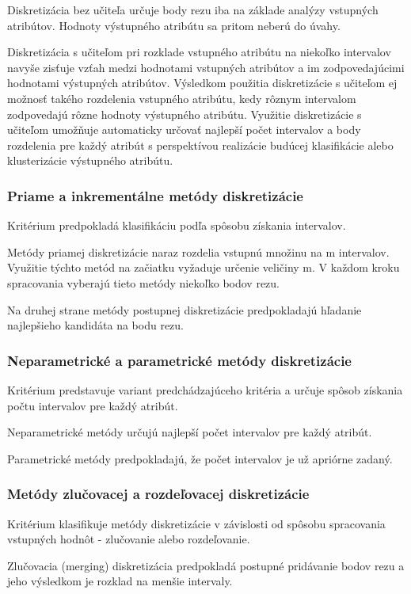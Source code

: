 Diskretizácia bez učiteľa určuje body rezu iba na základe analýzy vstupných atribútov. Hodnoty výstupného atribútu sa pritom neberú do úvahy. 

Diskretizácia s učiteľom pri rozklade vstupného atribútu na niekoľko intervalov navyše zisťuje vzťah medzi hodnotami vstupných atribútov a im zodpovedajúcimi hodnotami výstupných atribútov. Výsledkom použitia diskretizácie s učiteľom ej možnosť takého rozdelenia vstupného atribútu, kedy rôznym intervalom zodpovedajú rôzne hodnoty výstupného atribútu. Využitie diskretizácie s učiteľom umožňuje automaticky určovať najlepší počet intervalov a body rozdelenia pre každý atribút s perspektívou realizácie budúcej klasifikácie alebo klusterizácie výstupného atribútu. %
\cite{levashenkoProj}

\subsubsection{Priame a inkrementálne metódy diskretizácie}
Kritérium predpokladá klasifikáciu podľa spôsobu získania intervalov. 

Metódy priamej diskretizácie naraz rozdelia vstupnú množinu na m intervalov. Využitie týchto metód na začiatku vyžaduje určenie veličiny m. V každom kroku spracovania vyberajú tieto metódy niekoľko bodov rezu. 

Na druhej strane metódy postupnej diskretizácie predpokladajú hľadanie najlepšieho kandidáta na bodu rezu. 
\cite{levashenkoProj}
\subsubsection{Neparametrické a parametrické metódy diskretizácie }
Kritérium predstavuje variant predchádzajúceho kritéria a určuje spôsob získania počtu intervalov pre každý atribút. 

Neparametrické metódy určujú najlepší počet intervalov pre každý atribút. 

Parametrické metódy predpokladajú, že počet intervalov je už apriórne zadaný. 
\cite{levashenkoProj}

\subsubsection{Metódy zlučovacej a rozdeľovacej diskretizácie}
Kritérium klasifikuje metódy diskretizácie v závislosti od spôsobu spracovania vstupných hodnôt - zlučovanie alebo rozdeľovanie. 

Zlučovacia (merging) diskretizácia predpokladá postupné pridávanie bodov rezu a jeho výsledkom je rozklad na menšie intervaly. 

